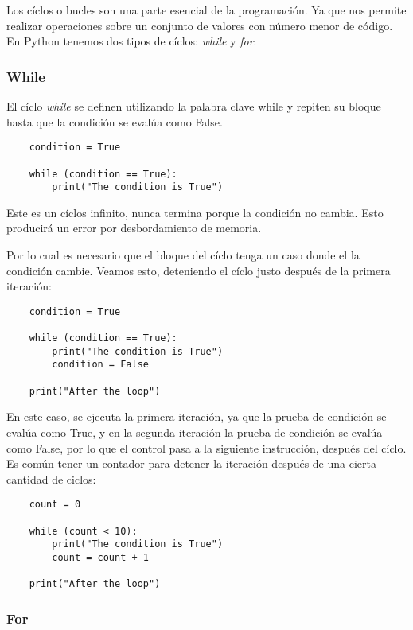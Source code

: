 \documentclass[12pt]{article}
\theoremstyle{definition}
\begin{document}
    Los cíclos o bucles son una parte esencial de la programación.
    Ya que nos permite realizar operaciones sobre un conjunto de valores con número menor de código.
    En Python tenemos dos tipos de cíclos: \textit{while} y \textit{for}.

    \subsubsection{While}
    El cíclo \textit{while} se definen utilizando la palabra clave while y repiten su bloque hasta que la condición se evalúa como False.

    \begin{lstlisting}
    condition = True

    while (condition == True):
        print("The condition is True")
    \end{lstlisting}

    Este es un cíclos infinito, nunca termina porque la condición no cambia.
    Esto producirá un error por desbordamiento de memoria.

    Por lo cual es necesario que el bloque del cíclo tenga un caso donde el la condición cambie.
    Veamos esto, deteniendo el cíclo justo después de la primera iteración:
    \begin{lstlisting}
    condition = True

    while (condition == True):
        print("The condition is True")
        condition = False

    print("After the loop")
    \end{lstlisting}

    En este caso, se ejecuta la primera iteración, ya que la prueba de condición se evalúa como True, y en la segunda
    iteración la prueba de condición se evalúa como False, por lo que el control pasa a la siguiente instrucción,
    después del cíclo.
    Es común tener un contador para detener la iteración después de una cierta cantidad de ciclos:

    \begin{lstlisting}
    count = 0

    while (count < 10):
        print("The condition is True")
        count = count + 1

    print("After the loop")
    \end{lstlisting}

    \subsubsection{For}
\end{document}
